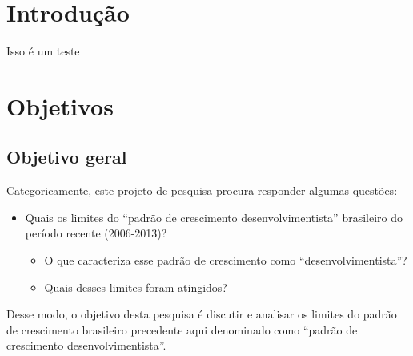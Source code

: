 \documentclass[12pt]{report}
\begin{document}
%

%
\geraTitulo

%
%
%

\begin{comment}
Habilitar caso seja necessário um abstract em outra página

\Abstract{
teste in english
}
\end{comment}
%
\tableofcontents
\clearpage
%

\sectionfont{\scshape}

\chapter{Introdução}\label{Intro} 
Isso é um teste 

{\let\clearpage\relax 
\chapter{Objetivos}\label{OBJ}}

\section{Objetivo geral}

Categoricamente, este projeto de pesquisa procura responder algumas questões: 

\begin{itemize}[label={--}]
	\item Quais os limites do ``padrão de crescimento desenvolvimentista'' brasileiro do período recente (2006-2013)?
	\begin{itemize}[label={--}]
	\item O que caracteriza esse padrão de crescimento como ``desenvolvimentista''?
	\item Quais desses limites foram atingidos?
\end{itemize}
\end{itemize}

Desse modo, o objetivo desta pesquisa é discutir e analisar os limites do padrão de crescimento brasileiro precedente aqui denominado como ``padrão de crescimento desenvolvimentista''.  
\end{document}
